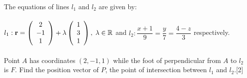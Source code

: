 \documentclass[12pt, a4 paper]{article}
\begin{document}
\begin{outline}[enumerate]
																														        
					\color{black}
					\1  The equations of lines ${l_1}$ and ${l_2}$ are given by:\\\\${l_1}:{\bf{r}} = \left( {\begin{array}{*{20}{c}}2\\{ - 1}\\1\end{array}} \right) + \lambda \left( {\begin{array}{*{20}{c}}1\\3\\1\end{array}} \right),\;\lambda  \in \mathbb{R}$ and ${l_2}:\dfrac{{x + 1}}{9} = \dfrac{y}{7} = \dfrac{{4 - z}}{3}$ respectively.\\\\Point $A$ has coordinates $(2, - 1,1)$ while the foot of perpendicular from $A$ to ${l_2}$ is $F$.
					\2 Find the position vector of $P$, the point of intersection between ${l_1}$ and ${l_2}$.\hfill[2]
					\color{blue}   
					\begin{align*}

\end{align*}
\end{outline}
\end{document}
